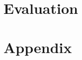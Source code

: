 \documentclass[
paper=a4,
fontsize = 12pt, %
headsepline,     %
titlepage,       %
numbers=noenddot,
headings=optiontohead, %
]{scrbook}
\begin{document}
\part{Evaluation}\label{part:evaluation}










\appendix
\part*{Appendix}\label{part:appendix}

\printbibliography
\end{document}
